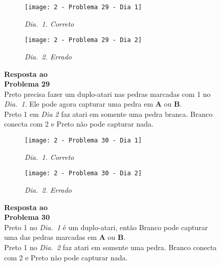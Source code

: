 \begin{SCfigure}[][h!]
    \begin{subfigure}[t]{.31\textwidth}
        \texttt{[image: 2 - Problema 29 - Dia 1]}
        \caption*{\emph{Dia.\@~1. Correto}}
    \end{subfigure}
    \hfill
    \begin{subfigure}[t]{.31\textwidth}
        \texttt{[image: 2 - Problema 29 - Dia 2]}
        \caption*{\emph{Dia.\@~2. Errado}}
    \end{subfigure}
    \hfill
    \caption*{\textbf{Resposta ao\\Problema 29}\\\vspace*{.25cm}Preto precisa fazer um duplo-atari  nas pedras marcadas com 1 no \emph{Dia.\@~1}. Ele pode agora capturar uma pedra em \textbf{A} ou \textbf{B}.\\\vspace*{.25cm}Preto 1 em \emph{Dia 2} faz atari em somente uma pedra branca. Branco conecta com 2 e Preto não pode capturar nada.}
\end{SCfigure}

\pagebreak

\begin{SCfigure}[][h!]
    \begin{subfigure}[t]{.31\textwidth}
        \texttt{[image: 2 - Problema 30 - Dia 1]}
        \caption*{\emph{Dia.\@~1. Correto}}
    \end{subfigure}
    \hfill
    \begin{subfigure}[t]{.31\textwidth}
        \texttt{[image: 2 - Problema 30 - Dia 2]}
        \caption*{\emph{Dia.\@~2. Errado}}
    \end{subfigure}
    \hfill
    \caption*{\textbf{Resposta ao\\Problema 30}\\\vspace*{.25cm}Preto 1 no \emph{Dia.\@~1} é um duplo-atari, então Branco pode capturar uma das pedras marcadas em \textbf{A} ou \textbf{B}.\\\vspace*{.25cm}Preto 1 no \emph{Dia.\@~2} faz atari em somente uma pedra. Branco conecta com 2 e Preto não pode capturar nada.}
\end{SCfigure}